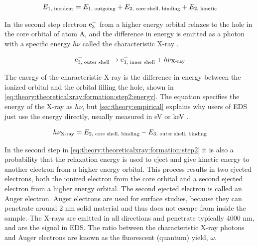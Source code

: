 \begin{equation}
    \label{eq:theory:theoreticalxray:formation:step1:energy}
    E_{1 {\textnormal{, incident}}} = E_{1 {\textnormal{, outgoing}}} + E_{2 {\textnormal{, core shell, binding}}} + E_{2 {\textnormal{, kinetic}}}
\end{equation}

In the second step electron $\textnormal{e}^-_{3}$ from a higher energy orbital relaxes to the hole in the core orbital of atom A, and the difference in energy is emitted as a photon with a specific energy $h\nu$ called the characteristic X-ray \cite[Eq. (8.12)]{hollas_modern_2004}.

\begin{equation}
    \label{eq:theory:theoreticalxray:formation:step2}
    \textnormal{e}^-_{3 {\textnormal{, outer shell}}} \rightarrow \textnormal{e}^-_{3 {\textnormal{, inner shell}}} + h\nu_{\textnormal{X-ray}}
\end{equation}

The energy of the characteristic X-ray is the difference in energy between the ionized orbital and the orbital filling the hole, shown in \cref{eq:theory:theoreticalxray:formation:step2:energy}.
The equation specifies the energy of the X-ray as $h\nu$, but \cref{sec:theory:empirical} explains why users of EDS just use the energy directly, usually measured in eV or keV \cite[Eq. (4.2b)]{goldstein_scanning_2018}.

\begin{equation}
    \label{eq:theory:theoreticalxray:formation:step2:energy}
    h\nu_{\textnormal{X-ray}} = E_{2 {\textnormal{, core shell, binding}}} - E_{3 {\textnormal{, outer shell, binding}}}
\end{equation}


In the second step in \cref{eq:theory:theoreticalxray:formation:step2} it is also a probability that the relaxation energy is used to eject and give kinetic energy to another electron from a higher energy orbital.
This process results in two ejected electrons, both the ionized electron from the core orbital and a second ejected electron from a higher energy orbital.
The second ejected electron is called an Auger electron.
Auger electrons are used for surface studies, because they can penetrate around 2 nm solid material and thus does not escape from inside the sample.
The X-rays are emitted in all directions and penetrate typically 4000 nm, and are the signal in EDS.
The ratio between the characteristic X-ray photons and Auger electrons are known as the fluorescent (quantum) yield, $\omega$. %

